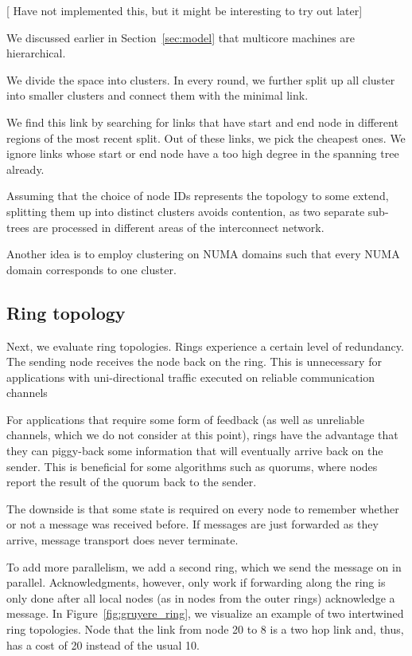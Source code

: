 \documentclass{article}
\newcommand{\stefan}[1]{
  {\color{skRed}[{\color{red}{SK}} #1]}}
\begin{document}
\stefan{Have not implemented this, but it might be interesting to try
  out later}

We discussed earlier in Section~\ref{sec:model} that
multicore machines are hierarchical.%

We divide the space into clusters. In every round, we further split up
all cluster into smaller clusters and connect them with the minimal
link. 

We find this link by searching for links that have start and
end node in different regions of the most recent split. Out of these
links, we pick the cheapest ones. We ignore links whose start or end
node have a too high degree in the spanning tree already.

Assuming that the choice of node IDs represents the topology to some
extend, splitting them up into distinct clusters avoids contention, as
two separate sub-trees are processed in different areas of the
interconnect network.

Another idea is to employ clustering on NUMA domains such that every
NUMA domain corresponds to one cluster. 

\subsection{Ring topology}

Next, we evaluate ring topologies. Rings experience a certain level of
redundancy. The sending node receives the node back on the ring. This
is unnecessary for applications with uni-directional traffic executed
on reliable communication channels

For applications that require some form of feedback (as well as
unreliable channels, which we do not consider at this point), rings
have the advantage that they can piggy-back some information that will
eventually arrive back on the sender. This is beneficial for some
algorithms such as quorums, where nodes report the result of the
quorum back to the sender.

The downside is that some state is required on every node to remember
whether or not a message was received before. If messages are just
forwarded as they arrive, message transport does never terminate.

To add more parallelism, we add a second ring, which we send the
message on in parallel. Acknowledgments, however, only work if
forwarding along the ring is only done after all local nodes (as in
nodes from the outer rings) acknowledge a message. In
Figure~\ref{fig:gruyere_ring}, we visualize an example of two
intertwined ring topologies. Node that the link from node 20 to 8 is a
two hop link and, thus, has a cost of 20 instead of the usual 10.
\end{document}
